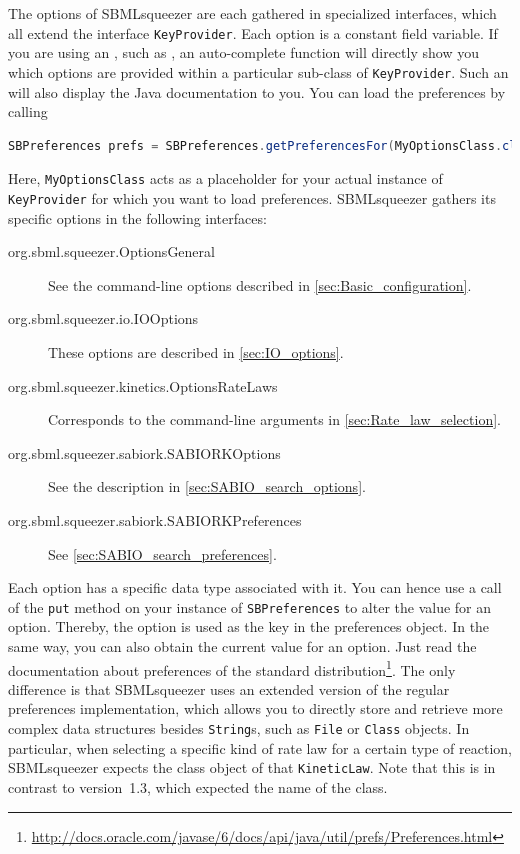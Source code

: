 The options of SBMLsqueezer are each gathered in specialized interfaces, which all extend the interface \texttt{KeyProvider}.
Each option is a constant field variable.
If you are using an \IDE, such as \Eclipse, an auto-complete function will directly show you which options are provided within a particular sub-class of \texttt{KeyProvider}.
Such an \IDE will also display the Java documentation to you.
You can load the preferences by calling
\begin{lstlisting}[language=Java, numbers=none, caption={Loading preferences in SBMLsqueezer 2.1}]
SBPreferences prefs = SBPreferences.getPreferencesFor(MyOptionsClass.class);
\end{lstlisting}
Here, \texttt{MyOptionsClass} acts as a placeholder for your actual instance of \texttt{KeyProvider} for which you want to load preferences.
SBMLsqueezer gathers its specific options in the following interfaces:
\renewcommand{\descriptionlabel}[1]{\textcolor{blue}{\texttt{#1}}}
\begin{description}
  \item[org.sbml.squeezer.OptionsGeneral] See the command-line options described in \vref{sec:Basic_configuration}.
  \item[org.sbml.squeezer.io.IOOptions] These options are described in \vref{sec:IO_options}.
  \item[org.sbml.squeezer.kinetics.OptionsRateLaws] Corresponds to the command-line arguments in \vref{sec:Rate_law_selection}.
  \item[org.sbml.squeezer.sabiork.SABIORKOptions] See the description in \vref{sec:SABIO_search_options}.
  \item[org.sbml.squeezer.sabiork.SABIORKPreferences] See \vref{sec:SABIO_search_preferences}.
\end{description}
Each option has a specific data type associated with it.
You can hence use a call of the \texttt{put} method on your instance of \texttt{SBPreferences} to alter the value
for an option.
Thereby, the option is used as the key in the preferences object.
In the same way, you can also obtain the current value for an option.
Just read the documentation about preferences of the standard \Java distribution\footnote{\url{http://docs.oracle.com/javase/6/docs/api/java/util/prefs/Preferences.html}}.
The only difference is that SBMLsqueezer uses an extended version of the regular preferences implementation, which allows you to directly store and retrieve more complex data structures besides \texttt{String}s, such as \texttt{File} or \texttt{Class} objects.
In particular, when selecting a specific kind of rate law for a certain type of reaction, SBMLsqueezer expects the class object of that \texttt{KineticLaw}.
Note that this is in contrast to version~1.3, which expected the name of the class.

